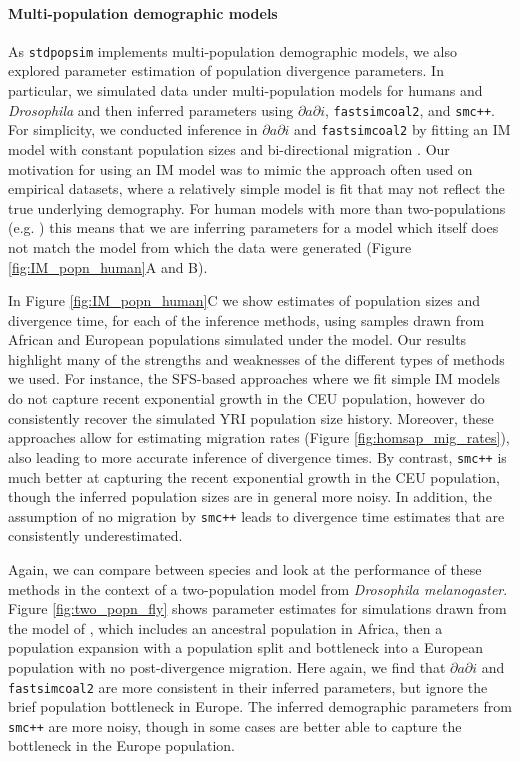 \documentclass[12pt,halfline,a4paper]{ouparticle}
\newcommand{\dadi}{$\partial a \partial i$\xspace}
\newcommand{\smcpp}{\texttt{smc++}\xspace}
\newcommand{\fastsimcoal}{\texttt{fastsimcoal2}\xspace}
\begin{document}
\paragraph*{Multi-population demographic models}
As \texttt{stdpopsim} implements multi-population demographic models, we also
explored parameter estimation of population divergence parameters. In particular,
we simulated data under multi-population models for humans and \emph{Drosophila}
and then inferred  parameters using \dadi, \fastsimcoal, and \smcpp.
For simplicity, we conducted inference in \dadi and \fastsimcoal by fitting an IM model
with constant population sizes and bi-directional migration \citep{hey2004im}. Our motivation for using
an IM model was to mimic the approach often used on empirical datasets, where a relatively
simple model is fit that may not reflect the true underlying demography.
For human models with more than two-populations (e.g. \cite{gutenkunst2009inferring})
this means that we are inferring parameters for a model which itself does
not match the model from which the data were generated (Figure
\ref{fig:IM_popn_human}A and B).

In Figure \ref{fig:IM_popn_human}C we show estimates of population sizes and divergence
time, for each of the inference methods, using samples drawn from African and European populations
simulated under the \cite{gutenkunst2009inferring} model. Our results highlight many
of the strengths and weaknesses of the different types of methods we used.
For instance, the SFS-based approaches where we fit simple IM models do not capture
recent exponential growth in the CEU population, however do consistently recover the
simulated YRI population size history. Moreover, these approaches allow for estimating
migration rates (Figure \ref{fig:homsap_mig_rates}), also leading to more accurate inference
of divergence times. By contrast, \smcpp is much better at capturing the recent exponential
growth in the CEU population, though the inferred population sizes are in general more
noisy. In addition, the assumption of no migration by \smcpp leads to divergence time
estimates that are consistently underestimated.

Again, we can compare between species and look at the performance of these methods in
the context of a two-population model from \emph{Drosophila melanogaster}. Figure
\ref{fig:two_popn_fly} shows parameter estimates for simulations drawn from
the model of \cite{li2006inferring}, which includes
an ancestral population in Africa, then a population expansion with a population
split and bottleneck into a European population with no post-divergence migration.
Here again, we find that \dadi and \fastsimcoal are more consistent in their inferred
parameters, but ignore the brief population bottleneck in Europe. The inferred
demographic parameters from \smcpp are more noisy, though in some cases are better
able to capture the bottleneck in the Europe population.
\end{document}
